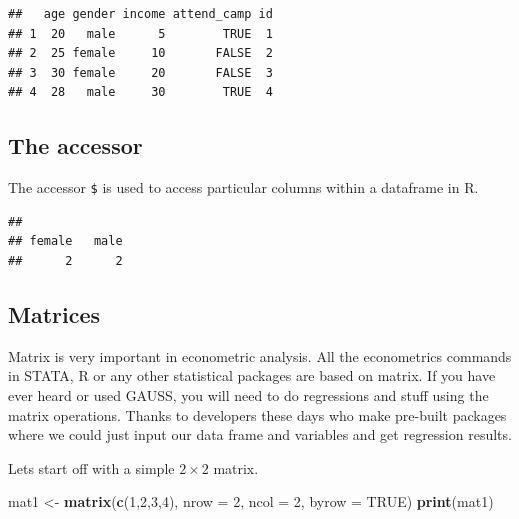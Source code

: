 \documentclass[
]{article}
\newenvironment{Shaded}{\begin{snugshade}}{\end{snugshade}}
\newcommand{\AttributeTok}[1]{\textcolor[rgb]{0.13,0.29,0.53}{#1}}
\newcommand{\CommentTok}[1]{\textcolor[rgb]{0.56,0.35,0.01}{\textit{#1}}}
\newcommand{\ConstantTok}[1]{\textcolor[rgb]{0.56,0.35,0.01}{#1}}
\newcommand{\DecValTok}[1]{\textcolor[rgb]{0.00,0.00,0.81}{#1}}
\newcommand{\FunctionTok}[1]{\textcolor[rgb]{0.13,0.29,0.53}{\textbf{#1}}}
\newcommand{\NormalTok}[1]{#1}
\newcommand{\OtherTok}[1]{\textcolor[rgb]{0.56,0.35,0.01}{#1}}
\newcommand{\SpecialCharTok}[1]{\textcolor[rgb]{0.81,0.36,0.00}{\textbf{#1}}}
\begin{document}
\begin{verbatim}
##   age gender income attend_camp id
## 1  20   male      5        TRUE  1
## 2  25 female     10       FALSE  2
## 3  30 female     20       FALSE  3
## 4  28   male     30        TRUE  4
\end{verbatim}

\subsection{The accessor}\label{the-accessor}

The accessor \texttt{\$} is used to access particular columns within a
dataframe in R.

\begin{Shaded}
\end{Shaded}

\begin{verbatim}
## 
## female   male 
##      2      2
\end{verbatim}

\subsection{Matrices}\label{matrices}

Matrix is very important in econometric analysis. All the econometrics
commands in STATA, R or any other statistical packages are based on
matrix. If you have ever heard or used GAUSS, you will need to do
regressions and stuff using the matrix operations. Thanks to developers
these days who make pre-built packages where we could just input our
data frame and variables and get regression results.

Lets start off with a simple \(2\times2\) matrix.

\begin{Shaded}
\begin{Highlighting}[]
\NormalTok{mat1 }\OtherTok{\textless{}{-}} \FunctionTok{matrix}\NormalTok{(}\FunctionTok{c}\NormalTok{(}\DecValTok{1}\NormalTok{,}\DecValTok{2}\NormalTok{,}\DecValTok{3}\NormalTok{,}\DecValTok{4}\NormalTok{), }\AttributeTok{nrow =} \DecValTok{2}\NormalTok{, }\AttributeTok{ncol =} \DecValTok{2}\NormalTok{, }\AttributeTok{byrow =} \ConstantTok{TRUE}\NormalTok{)}
\FunctionTok{print}\NormalTok{(mat1)}
\end{Highlighting}
\end{Shaded}
\end{document}

